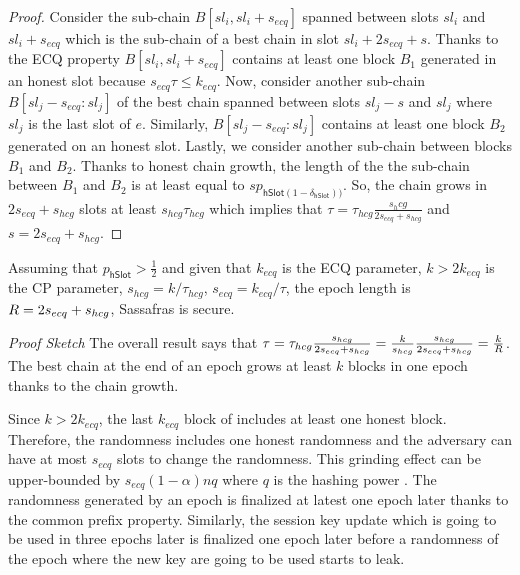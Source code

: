 \begin{proof}
	Consider the sub-chain $ B[sl_i,sl_i+s_{ecq}] $ spanned between slots $ sl_i $ and $ sl_i + s_{ecq} $  which is the sub-chain of a best chain in slot $ sl_i +  2s_{ecq} + s  $. Thanks to the ECQ property $ B[sl_i,sl_i+s_{ecq}] $ contains at least one block $ B_1 $ generated in an honest slot because  $ s_{ecq} \tau\leq k_{ecq} $.   Now, consider another sub-chain $ B[sl_j -s_{ecq} :sl_j] $ of the best chain spanned between slots $ sl_j - s $ and $ sl_j $ where $ sl_j $  is the last slot of $ e $. Similarly, $ B[sl_j -s_{ecq} :sl_j] $ contains at least one block $ B_2 $ generated on an honest slot. Lastly, we consider another sub-chain between blocks $ B_1 $ and $ B_2 $.  Thanks to honest chain growth, the length of the the sub-chain between $ B_1 $ and $ B_2 $ is at least equal to $ s p_{\mathsf{hSlot}(1-\delta_{\mathsf{hSlot}}))} $. So, the chain grows in $ 2s_{ecq} + s_{hcg} $ slots at least $ s_{hcg}\tau_{hcg} $ which implies that $ \tau = \tau_{hcg} \frac{s_hcg}{2 s_{ecq} + s_{hcg}} $ \cite{genesis} and $ s = 2s_{ecq} + s_{hcg} $. 
\end{proof}



\begin{theorem}
	Assuming that  $ p_{\mathsf{hSlot}} >\frac{1}{2}$ and given that  $k_{ecq}$ is the ECQ parameter, $k > 2k_{ecq}$ is the CP parameter, $s_{hcg} = k/\tau_{hcg}$, $s_{ecq} = k_{ecq}/\tau$, the epoch length is $R  = 2s_{ecq} + s_{hcg}$, Sassafras is secure.
\end{theorem}

\emph{Proof Sketch}
	The overall result says that $\tau = \tau_{hcg}\frac{s_{hcg}}{2s_{ecq}+s_{hcg}} = \frac{k}{s_{hcg}}\frac{s_{hcg}}{2s_{ecq}+s_{hcg}} = \frac{k}{R }$. The best chain at the end of an epoch grows at least $k$ blocks in one epoch thanks to the chain growth.
	
	Since $k > 2k_{ecq}$, the last $k_{ecq}$ block of includes at least one honest block. Therefore, the randomness includes one honest randomness and the adversary can have at most $s_{ecq}$ slots to change the randomness. This grinding effect can be upper-bounded by $s_{ecq}(1-\alpha)nq$ where $q$ is the hashing power \cite{ouroboros}. The randomness generated by an epoch is finalized at latest one epoch later thanks to the common prefix property. Similarly, the session key update which is going to be used in three epochs later is finalized one epoch later before a randomness of the epoch where the new key are going to be used starts to leak.
	
